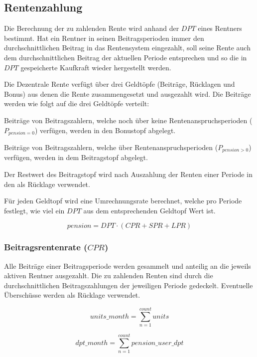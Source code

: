 \subsection{Rentenzahlung}
Die Berechnung der zu zahlenden Rente wird anhand der $DPT$ eines Rentners bestimmt.
Hat ein
Rentner in seinen Beitragsperioden immer den durchschnittlichen Beitrag in das
Rentensystem eingezahlt, soll seine
Rente auch dem durchschnittlichen Beitrag der aktuellen
Periode entsprechen und so die in $DPT$ gespeicherte Kaufkraft wieder hergestellt werden.


Die Dezentrale Rente verfügt über drei Geldtöpfe (Beiträge, Rücklagen und Bonus) 
aus denen die Rente zusammengesetzt und ausgezahlt wird. Die Beiträge werden wie folgt auf 
die drei Geldtöpfe verteilt:
\begin{compactenum}
\item Beiträge von Beitragszahlern, welche noch über keine Rentenanspruchsperioden ($P_{pension = 0}$) verfügen, werden in den Bonustopf abgelegt.
\item Beiträge von Beitragszahlern, welche über Rentenanspruchsperioden ($P_{pension > 0}$) verfügen, werden in dem Beitragstopf abgelegt.
\item Der Restwert des Beitragstopf wird nach Auszahlung der Renten einer Periode in den als Rücklage verwendet.
\end{compactenum}

Für jeden Geldtopf wird eine Umrechnungsrate berechnet, welche pro 
Periode festlegt, wie viel ein $DPT$ aus dem entsprechenden
Geldtopf Wert ist.

\begin{equation}
pension = DPT \cdot (CPR + SPR + LPR)
\end{equation}

\subsubsection*{Beitragsrentenrate ($CPR$)}
Alle Beiträge einer Beitragsperiode werden gesammelt und anteilig an die jeweils
aktiven Rentner ausgezahlt.
Die zu zahlenden Renten sind durch die durchschnittlichen Beitragszahlungen der 
jeweiligen Periode gedeckelt. Eventuelle Überschüsse werden als Rücklage verwendet.

\begin{equation}
	units\_month = 
	\sum_{n=1}^{count} units
\end{equation}

\begin{equation}
	dpt\_month = 
	\sum_{n=1}^{count} pension\_user\_dpt
\end{equation}

